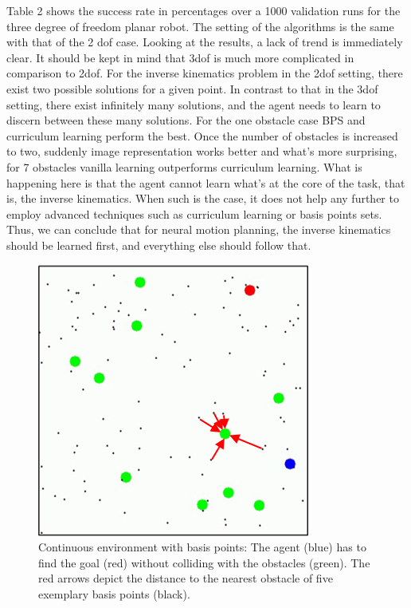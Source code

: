 \documentclass[conference]{IEEEtran}
\begin{document}
Table 2 shows the success rate in percentages over a 1000 validation runs for the three degree of freedom planar robot. The setting of the algorithms is the same with that of the 2 dof case. 
Looking at the results, a lack of trend is immediately clear. It should be kept in mind that 3dof is much more complicated in comparison to 2dof. For the inverse kinematics problem in the 2dof setting, there exist two possible solutions for a given point. In contrast to that in the 3dof setting, there exist infinitely many solutions, and the agent needs to learn to discern between these many solutions. 
For the one obstacle case BPS and curriculum learning perform the best. Once the number of obstacles is increased to two, suddenly image representation works better and what’s more surprising, for 7 obstacles vanilla learning outperforms curriculum learning. What is happening here is that the agent cannot learn what’s at the core of the task, that is, the inverse kinematics. When such is the case, it does not help any further to employ advanced techniques such as curriculum learning or basis points sets. Thus, we can conclude that for neural motion planning, the inverse kinematics should be learned first, and everything else should follow that. 









\begin{figure}[htbp]
\centerline{\includegraphics{bps.png}}
\caption{Continuous environment with basis points: The agent (blue) has to find the goal (red) without colliding with the obstacles (green). The red arrows depict the distance to the nearest obstacle of five exemplary basis points (black).}
\label{fig1}
\end{figure}
\end{document}
